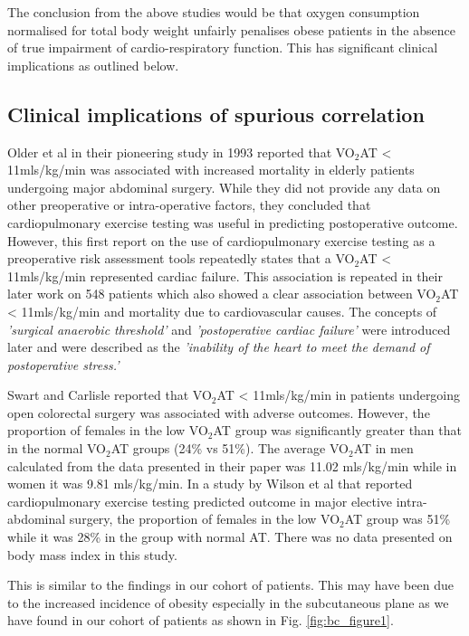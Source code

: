 The conclusion from the above studies would be that oxygen consumption normalised for total body weight unfairly penalises obese patients in the absence of true impairment of cardio-respiratory function. This has significant clinical implications as outlined below.

\subsection{Clinical implications of spurious correlation}
Older et al in their pioneering study in 1993 reported that VO$_2$AT < 11mls/kg/min was associated with increased mortality in elderly patients undergoing major abdominal surgery.\parencite{older_preoperative_1993} While they did not provide any data on other preoperative or intra-operative factors, they concluded that cardiopulmonary exercise testing was useful in predicting postoperative outcome. However, this first report on the use of cardiopulmonary exercise testing as a preoperative risk assessment tools repeatedly states that a VO$_2$AT < 11mls/kg/min represented cardiac failure. This association is repeated in their later work on 548 patients which also showed a clear association between VO$_2$AT < 11mls/kg/min and mortality due to cardiovascular causes. \parencite{older_cardiopulmonary_1999} The concepts of \textit{'surgical anaerobic threshold'} and \textit{'postoperative cardiac failure'} were introduced later and were described as the \textit{'inability of the heart to meet the demand of postoperative stress.'}\parencite{society_ats/accp_2003}

Swart and Carlisle reported that VO$_2$AT < 11mls/kg/min in patients undergoing open colorectal surgery was associated with adverse outcomes.\parencite{swart_case-controlled_2012} However, the proportion of females in the low VO$_2$AT group was significantly greater than that in the normal VO$_2$AT groups (24\% vs 51\%). The average VO$_2$AT in men calculated from the data presented in their paper was 11.02 mls/kg/min while in women it was 9.81 mls/kg/min. In a study by Wilson et al that reported cardiopulmonary exercise testing predicted outcome in major elective intra-abdominal surgery, the proportion of females in the low VO$_2$AT group was 51\% while it was 28\% in the group with normal AT.\parencite{wilson_impaired_2010} There was no data presented on body mass index in this study.

This is similar to the findings in our cohort of patients. This may have been due to the increased incidence of obesity especially in the subcutaneous plane as we have found in our cohort of patients as shown in Fig. \ref{fig:bc_figure1}.

